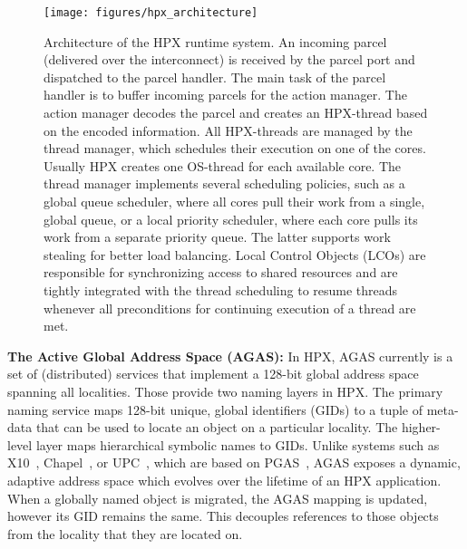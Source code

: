 \documentclass{sig-alternate}
\newcommand{\B}[1]{\textbf{#1}}
\newcommand{\upp}{\vspace*{-0.5em}}
\newcommand{\up}{\vspace*{-0.25em}}
\begin{document}
\begin{figure}
  \texttt{[image: figures/hpx\_architecture]}
    \upp
  \caption{\small{Architecture of the HPX runtime system. An incoming parcel (delivered over the interconnect)
is received by the parcel port and dispatched to the parcel handler. The
main task of the parcel handler is to buffer incoming parcels for the action manager. The action
manager decodes the parcel and creates an HPX-thread based on the encoded information.
All HPX-threads are managed by the thread manager, which schedules their execution on one
of the cores. Usually HPX creates one OS-thread for each available core. The thread
manager implements several scheduling policies, such as a global queue scheduler, where all
cores pull their work from a single, global queue, or a local priority scheduler, where each core
pulls its work from a separate priority queue. The latter supports work stealing for better
load balancing. Local Control Objects (LCOs) are responsible for synchronizing access to
shared resources and are tightly integrated with the thread scheduling to resume
threads whenever all preconditions for continuing execution of a thread are met.} }
\upp\upp
\label{fig:hpxarch}
\end{figure}

\B{The Active Global Address Space (AGAS):} In HPX, AGAS currently is a set of (distributed)
services that implement a 128-bit global address space spanning all localities.
Those provide two naming layers in HPX. The primary naming service maps
128-bit unique, global identifiers (GIDs) to a tuple of meta-data that can be used
to locate an object on a particular locality. The higher-level layer maps hierarchical
symbolic names to GIDs. Unlike systems such as
X10~\cite{Charles:2005:XOA:1103845.1094852},
Chapel~\cite{Chamberlain07parallelprogrammability}, or UPC~\cite{UPCSpec}, which are based on PGAS~\cite{pgas_link}, AGAS
exposes a dynamic, adaptive address space which evolves over the lifetime of an
HPX application. When a globally named object is migrated, the AGAS mapping is updated, however its GID remains the
same. This decouples references to those objects from the locality that they are
located on.
\end{document}
